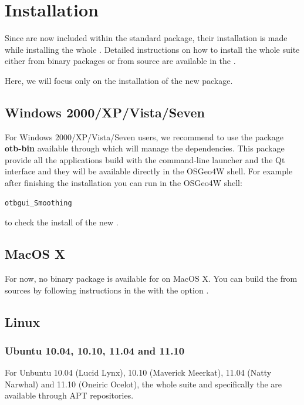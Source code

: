 \section{Installation}\label{sec:appinstall}

Since \app are now included within the standard \otb package, their 
installation is made while installing the whole \otb. Detailed 
instructions on how to install the whole \otb suite either from 
binary packages or from source are available in the \sg. 

Here, we will focus only on the installation of the new \app package.

\subsection{Windows 2000/XP/Vista/Seven}
\label{ssec:app_windows_binaries}

For Windows 2000/XP/Vista/Seven users, we recommend to use the package \textbf{otb-bin} available through \osgeow which will manage the dependencies. This package provide all the applications build with the command-line launcher and the Qt interface and they will be available directly in the OSGeo4W shell. For example after finishing the installation you can run in the OSGeo4W shell:
\begin{verbatim}
otbgui_Smoothing
\end{verbatim}
to check the install of the new \app.

\subsection{MacOS X}
\label{ssec:mac_binaries}

For now, no binary package is available for \app on MacOS X. You can build the \app from sources by following instructions in the \sg with the option  .

\subsection{Linux}

\subsubsection{Ubuntu 10.04, 10.10, 11.04 and 11.10}
\label{ssec:ubuntu_binaries}
For Unbuntu 10.04 (Lucid Lynx), 10.10 (Maverick Meerkat), 11.04 (Natty Narwhal) and 11.10 (Oneiric Ocelot), the whole \otb suite and  specifically the \app are available through APT repositories.


